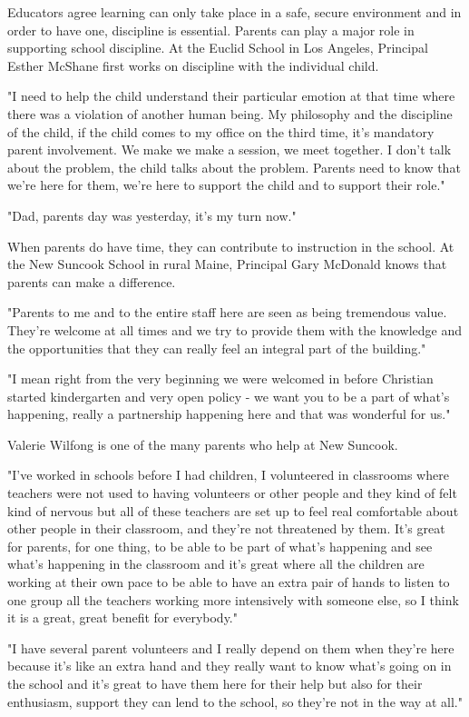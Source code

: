 Educators agree learning can only take place in a safe, secure environment and in order to have one, discipline is essential. Parents can play a major role in supporting school discipline. At the Euclid School in Los Angeles, Principal Esther McShane first works on discipline with the individual child.

"I need to help the child understand their particular emotion at that time where there was a violation of another human being. My philosophy and the discipline of the child, if the child comes to my office on the third time, it's mandatory parent involvement. We make we make a session, we meet together. I don't talk about the problem, the child talks about the problem. Parents need to know that we're here for them, we're here to support the child and to support their role."

"Dad, parents day was yesterday, it's my turn now."

When parents do have time, they can contribute to instruction in the school. At the New Suncook School in rural Maine, Principal Gary McDonald knows that parents can make a difference.

"Parents to me and to the entire staff here are seen as being tremendous value. They're welcome at all times and we try to provide them with the knowledge and the opportunities that they can really feel an integral part of the building."

"I mean right from the very beginning we were welcomed in before Christian started kindergarten and very open policy - we want you to be a part of what's happening, really a partnership happening here and that was wonderful for us."

Valerie Wilfong is one of the many parents who help at New Suncook.

"I've worked in schools before I had children, I volunteered in classrooms where teachers were not used to having volunteers or other people and they kind of felt kind of nervous but all of these teachers are set up to feel real comfortable about other people in their classroom, and they're not threatened by them. It's great for parents, for one thing, to be able to be part of what's happening and see what's happening in the classroom and it's great where all the children are working at their own pace to be able to have an extra pair of hands to listen to one group all the teachers working more intensively with someone else, so I think it is a great, great benefit for everybody."

"I have several parent volunteers and I really depend on them when they're here because it's like an extra hand and they really want to know what's going on in the school and it's great to have them here for their help but also for their enthusiasm, support they can lend to the school, so they're not in the way at all."


